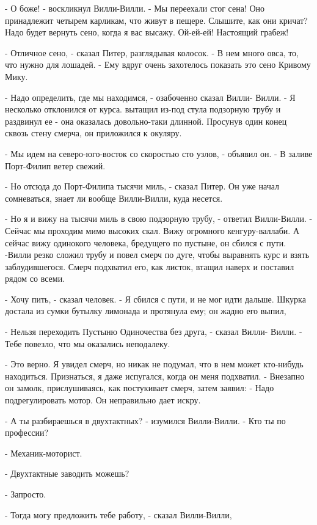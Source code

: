 \par- О боже! - воскликнул Вилли-Вилли. - Мы переехали стог сена! Оно 
принадлежит четырем карликам, что живут в пещере. Слышите, как они 
кричат? Надо будет вернуть сено, когда я вас высажу. Ой-ей-ей! 
Настоящий грабеж!
\par- Отличное сено, - сказал Питер, разглядывая колосок. - В нем 
много овса, то, что нужно для лошадей. - Ему вдруг очень захотелось 
показать это сено Кривому Мику.
\par- Надо определить, где мы находимся, - озабоченно сказал Вилли-
Вилли. - Я несколько отклонился от курса.
 вытащил из-под стула подзорную трубу и раздвинул ее - она 
оказалась довольно-таки длинной. Просунув один конец сквозь стену 
смерча, он приложился к окуляру.
\par- Мы идем на северо-юго-восток со скоростью сто узлов, - объявил 
он. - В заливе Порт-Филип ветер свежий.
\par- Но отсюда до Порт-Филипа тысячи миль, - сказал Питер. Он уже 
начал сомневаться, знает ли вообще Вилли-Вилли, куда несется.
\par- Но я и вижу на тысячи миль в свою подзорную трубу, - ответил 
Вилли-Вилли. - Сейчас мы проходим мимо высоких скал. Вижу огромного 
кенгуру-валлаби. А сейчас вижу одинокого человека, бредущего по 
пустыне, он сбился с пути.
-Вилли резко сложил трубу и повел смерч по дуге, чтобы 
выравнять курс и взять заблудившегося. Смерч подхватил его, как 
листок, втащил наверх и поставил рядом со всеми.
\par- Хочу пить, - сказал человек. - Я сбился с пути, и не мог идти 
дальше.
 Шкурка достала из сумки бутылку лимонада и протянула ему; он 
жадно его выпил,
\par- Нельзя переходить Пустыню Одиночества без друга, - сказал Вилли-
Вилли. - Тебе повезло, что мы оказались неподалеку.
\par- Это верно. Я увидел смерч, но никак не подумал, что в нем может 
кто-нибудь находиться. Признаться, я даже испугался, когда он меня 
подхватил. - Внезапно он замолк, прислушиваясь, как постукивает смерч, 
затем заявил: - Надо подрегулировать мотор. Он неправильно дает искру.
\par- А ты разбираешься в двухтактных? - изумился Вилли-Вилли. - Кто 
ты по профессии?
\par- Механик-моторист.
\par- Двухтактные заводить можешь?
\par- Запросто.
\par- Тогда могу предложить тебе работу, - сказал Вилли-Вилли, 
